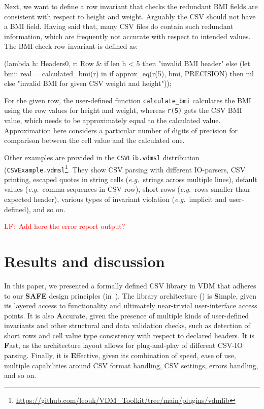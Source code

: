 \documentclass[runningheads,a4paper]{llncs}
\newcommand{\lfcomment}[1]{{\scriptsize\textcolor{red}{LF:~#1}}}  %
\begin{document}
Next, we want to define a row invariant that checks the redundant BMI fields are consistent with respect to height and weight. Arguably the CSV should not have a BMI field. Having said that, many CSV files do contain such redundant information, which are frequently not accurate with respect to intended values. The BMI check row invariant is defined as:
%
\begin{vdmsl}[frame=none,basicstyle=\ttfamily\scriptsize]    
    (lambda h: Headers0, r: Row &
    	  if len h < 5 then "invalid BMI header"
    	  else 
		      (let bmi: real = calculated_bmi(r) in
			      if approx_eq(r(5), bmi, PRECISION) then nil 
			      else "invalid BMI for given CSV weight and height"));
\end{vdmsl}
%
For the given row, the user-defined function \texttt{calculate\_bmi} calculates the BMI using the row values for height and weight, whereas \texttt{r(5)} gets the CSV BMI value, which needs to be approximately equal to the calculated value. Approximation here considers a particular number of digits of precision for comparison between the cell value and the calculated one.    

Other examples are provided in the \texttt{CSVLib.vdmsl} distribution (\texttt{CSVExample.vdmsl}\footnote{\url{https://github.com/leouk/VDM_Toolkit/tree/main/plugins/vdmlib}}. They show CSV parsing with different IO-parsers, CSV printing, escaped quotes in string cells (\textit{e.g.}~strings across multiple lines), default values (\textit{e.g.}~comma-sequences in CSV row), short rows (\textit{e.g.}~rows smaller than expected header), various types of invariant violation (\textit{e.g.}~implicit and user-defined), and so on. 

\lfcomment{Add here the error report output?}

\section{Results and discussion}\label{sec:Results}

In this paper, we presented a formally defined CSV library in VDM that adheres to our \textbf{SAFE} design principles (in~). The library architecture () is \textbf{S}imple, given its layered access to functionality and ultimately near-trivial user-interface access points. It is also \textbf{A}ccurate, given the presence of multiple kinds of user-defined invariants and other structural and data validation checks, such as detection of short rows and cell value type consistency with respect to declared headers. It is \textbf{F}ast, as the architecture layout allows for plug-and-play of different CSV-IO parsing. Finally, it is \textbf{E}ffective, given its combination of speed, ease of use, multiple capabilities around CSV format handling, CSV settings, errors handling, and so on.   
\end{document}
